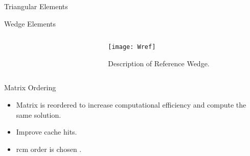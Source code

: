 \begin{frame}{Triangular Elements}
  \begin{figure}
    \centering
    \hspace{0.2in}
    \label{fig:triangle_elements}
  \end{figure}
\end{frame}

\begin{frame}{Wedge Elements}
  \begin{columns}
    \begin{column}{0.5\textwidth}
      \begin{figure}
        \centering
        \hspace{0.1\textwidth}
        \label{fig:sketch_wedge}
      \end{figure}
    \end{column}
    \begin{column}{0.5\textwidth}
      \begin{figure}
        \centering
        \texttt{[image: Wref]}
        \caption{Description of Reference Wedge.}
        \label{fig:Wref}
      \end{figure}
    \end{column}
  \end{columns}
\end{frame}

\begin{frame}{Matrix Ordering}
  \begin{itemize}
    \item Matrix is reordered to increase computational efficiency and compute
      the same solution.
    \item Improve cache hits.
    \item \gls{rcm} order is chosen \cite{rcm}.
  \end{itemize}
  \vspace{-0.25in}
  \begin{figure}
    \centering
    \hspace{0.1in}
    \label{fig:sparsity_pattern}
  \end{figure}
\end{frame}

